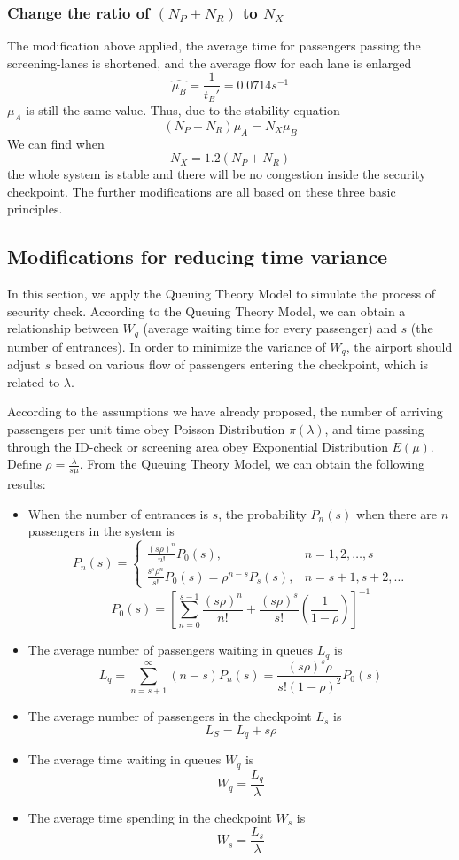 \documentclass{mcmthesis}
\begin{document}
	\subsubsection{Change the ratio of $(N_P+N_R)$ to $N_X$}
	The modification above applied, the average time for passengers passing the screening-lanes is shortened, and the average flow for each lane is enlarged
	$$\widehat{\mu_B}=\frac{1}{\overline{t_B}'}=0.0714s^{-1}$$
	$\mu_A$ is still the same value. Thus, due to the stability equation
	$$(N_P+N_R)\mu_A=N_X\mu_B$$
	We can find when
	$$N_X=1.2(N_P+N_R)$$
	the whole system is stable and there will be no congestion inside the security checkpoint.
	The further modifications are all based on these three basic principles.
	\subsection{Modifications for reducing time variance}
	In this section, we apply the Queuing Theory Model to simulate the process of security check. According to the Queuing Theory Model, we can obtain a relationship between $W_q$ (average waiting time for every passenger) and $s$ (the number of entrances). In order to minimize the variance of $W_q$, the airport should adjust $s$ based on various flow of passengers entering the checkpoint, which is related to $\lambda$.
	
	According to the assumptions we have already proposed, the number of arriving passengers per unit time obey Poisson Distribution $\pi(\lambda)$, and time passing through the ID-check or screening area obey Exponential Distribution $E(\mu)$. Define $\rho=\frac{\lambda}{s\mu}$. From the Queuing Theory Model, we can obtain the following results:
	
	\begin{itemize}
		\item When the number of entrances is $s$, the probability $P_n(s)$ when there are $n$ passengers in the system  is
		\begin{equation}
		P_n(s)=
		\begin{cases}
		\frac{(s\rho)^n}{n!}P_0(s), &\mbox{$n=1,2,\ldots,s$}\\
		\frac{s^s\rho^n}{s!}P_0(s)=\rho^{n-s}P_s(s), &\mbox{$n=s+1,s+2,\ldots$}
		\end{cases}
		\end{equation}
		$$P_0(s)=[\sum_{n=0}^{s-1}\frac{(s\rho)^n}{n!}+\frac{(s\rho)^s}{s!}(\frac{1}{1-\rho})]^{-1}$$
		\item The average number of passengers waiting in queues $L_q$ is
		$$L_q=\sum_{n=s+1}^{\infty}(n-s)P_n(s)=\frac{(s\rho)^s\rho}{s!(1-\rho)^2}P_0(s)$$
		\item The average number of passengers in the checkpoint $L_s$ is 
		$$L_S=L_q+s\rho$$
		\item The average time waiting in queues $W_q$ is
		$$W_q=\frac{L_q}{\lambda}$$
		\item The average time spending in the checkpoint $W_s$ is
		$$W_s=\frac{L_s}{\lambda}$$
	\end{itemize}
	
\end{document}
